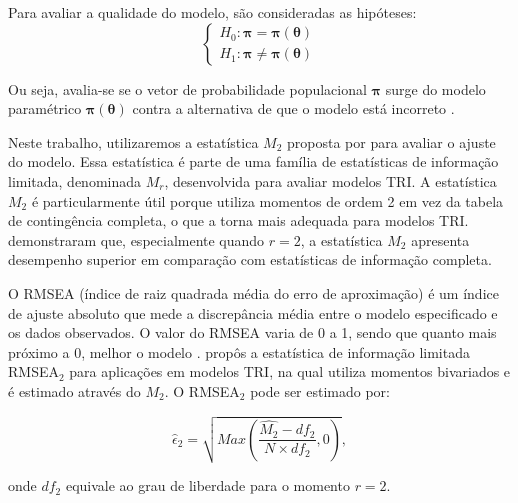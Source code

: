 Para avaliar a qualidade do modelo, são consideradas as hipóteses:
\[
\begin{cases}
H_0: \boldsymbol{\pi} = \boldsymbol{\pi}(\boldsymbol{\theta}) \\

H_1: \boldsymbol{\pi} \neq \boldsymbol{\pi}(\boldsymbol{\theta})
\end{cases}
\]

Ou seja, avalia-se se o vetor de probabilidade populacional $\boldsymbol{\pi}$ surge do modelo paramétrico $\boldsymbol{\pi}(\boldsymbol{\theta})$ contra a alternativa de que o modelo está incorreto \cite{maydeu2006limited}.

Neste trabalho, utilizaremos a estatística $M_2$ proposta por  para avaliar o ajuste do modelo. Essa estatística é parte de uma família de estatísticas de informação limitada, denominada $M_r$, desenvolvida para avaliar modelos TRI. A estatística $M_2$ é particularmente útil porque utiliza momentos de ordem 2 em vez da tabela de contingência completa, o que a torna mais adequada para modelos TRI.  demonstraram que, especialmente quando $r=2$, a estatística $M_2$ apresenta desempenho superior em comparação com estatísticas de informação completa. 



O RMSEA (índice de raiz quadrada média do erro de aproximação) é um índice de ajuste absoluto que mede a discrepância média entre o modelo especificado e os dados observados. O valor do RMSEA varia de 0 a 1, sendo que quanto mais próximo a 0, melhor o modelo \cite{kline2016principles}.  propôs a estatística de informação limitada RMSEA$_{2}$ para aplicações em modelos TRI, na qual utiliza momentos bivariados e é estimado através do $M_2$. O RMSEA$_2$ pode ser estimado por:

\[
	\hat{\epsilon}_2 = \sqrt{Max\left(\frac{\hat{M_{2}} - df_{2}}
		{N \times df_{2}}, 0 \right) } ,
\]

\noindent onde $df_2$ equivale ao grau de liberdade para o momento $r = 2$.



\begin{comment}
	Outro método método para avaliar o modelo são os índices TLI  (\textit{Tucker–Lewis Index}) e CFI (\textit{Comparative Fit Index}), TLI significa Índice Tucker-Lewis e CFI significa Índice de Ajuste Comparativo. O TLI  compara o modelo estimado com um modelo teórico nulo e visa determinar se todos os indicadores são
	associados a um único fator latente, o CFI é um indicador adicional que serve para comparar modelos alternativos \cite{boruchovitch2017dark}. Ambos os indicadores indicam modelos com bom ajustes quando seu valor próximos de 1 \cite{hair2009multivariada}). 
\end{comment}


